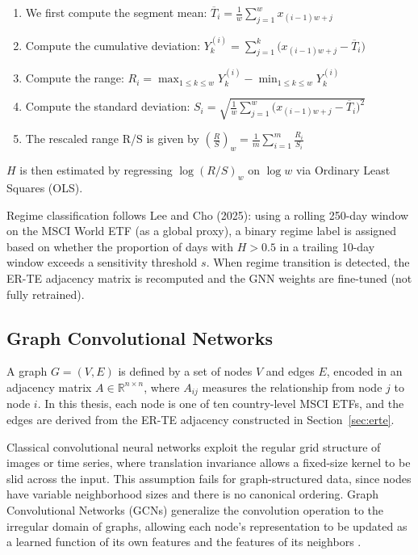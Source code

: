 \documentclass[12pt,oneside]{report}
\begin{document}
\begin{enumerate}
  \item We first compute the segment mean:
        $\overline{T}_{i} = \frac{1}{w}\sum_{j=1}^{w} x_{(i-1)w+j}$
  \item Compute the cumulative deviation:
        $Y_{k}^{(i)} = \sum_{j=1}^{k}\bigl(x_{(i-1)w+j} - \overline{T}_{i}\bigr)$
  \item Compute the range:
        $R_{i} = \max_{1 \le k \le w} Y_{k}^{(i)} - \min_{1 \le k \le w} Y_{k}^{(i)}$
  \item Compute the standard deviation:
        $S_{i} = \sqrt{\frac{1}{w}\sum_{j=1}^{w}\bigl(x_{(i-1)w+j} - \overline{T}_{i}\bigr)^{2}}$
  \item The rescaled range R/S is given by
        $\left(\frac{R}{S}\right)_{w} = \frac{1}{m}\sum_{i=1}^{m}\frac{R_{i}}{S_{i}}$
\end{enumerate}

$H$ is then estimated by regressing $\log(R/S)_{w}$ on $\log w$ via
Ordinary Least Squares (OLS).

Regime classification follows Lee and Cho (2025): using a rolling
250-day window on the MSCI World ETF (as a global proxy), a binary
regime label is assigned based on whether the proportion of days with
$H > 0.5$ in a trailing 10-day window exceeds a sensitivity threshold
$s$. When regime transition is detected, the ER-TE adjacency matrix is
recomputed and the GNN weights are fine-tuned (not fully retrained).

\subsection{Graph Convolutional Networks}

A graph $G = (V, E)$ is defined by a set of nodes $V$ and edges $E$,
encoded in an adjacency matrix $A \in \mathbb{R}^{n \times n}$, where
$A_{ij}$ measures the relationship from node $j$ to node $i$. In this
thesis, each node is one of ten country-level MSCI ETFs, and the edges
are derived from the ER-TE adjacency constructed in
Section~\ref{sec:erte}.

Classical convolutional neural networks exploit the regular grid
structure of images or time series, where translation invariance allows
a fixed-size kernel to be slid across the input. This assumption fails
for graph-structured data, since nodes have variable neighborhood sizes
and there is no canonical ordering. Graph Convolutional Networks (GCNs)
generalize the convolution operation to the irregular domain of graphs,
allowing each node's representation to be updated as a learned function
of its own features and the features of its neighbors \cite{kipf2017}.
\end{document}
